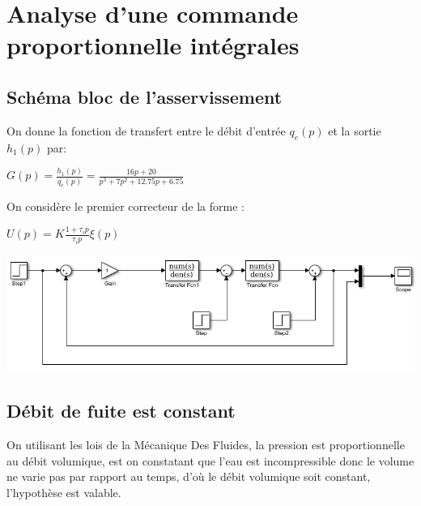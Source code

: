 \documentclass[12pt, a4paper, openany]{report}
\begin{document}
	
\chapter{ Analyse d'une commande proportionnelle intégrales}
 
 \section{Schéma bloc de l'asservissement}  %
   On donne la fonction de transfert entre le débit d'entrée  $q_{e}(p)$ et la sortie  $h_{1}(p)$ par: \\
   \begin{center}
   $G(p)=\frac {h_{1}(p)}{q_{e}(p)}=\frac{16p+20}{p^{3}+7p^{2}+12.75p+6.75}$   
   \end{center}
   
   On considère le premier correcteur de la forme : \\
   \begin{center}
   $U(p)=K\frac {1+\tau_{i}p}{\tau_{i}p}\xi(p)$ 
   \\[2cm]  
   \end{center}  
   
   \begin{center}
    \includegraphics[scale=0.8]{schemabloc.png}
    \label{fig2}
   \end{center}
  
   
  
 \section{Débit de fuite est constant}  %
 
 
 On utilisant les lois de la Mécanique Des Fluides, la pression est proportionnelle au débit volumique, est on constatant que l'eau est incompressible donc le volume ne varie pas par rapport au temps, d’où le débit volumique soit constant, l'hypothèse est valable. 
 
\end{document}
